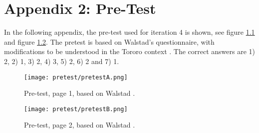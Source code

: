 \chapter{Appendix 2: Pre-Test}\label{cha:pre-test}

In the following appendix, the pre-test used for iteration 4 is shown, see figure \ref{fig:pretest1} and figure \ref{fig:pretest2}. The pretest is based on Walstad's questionnaire, with modifications to be understood in the Tororo context \cite{general-entrepreneurship-quiz}. The correct answers are 1) 2, 2) 1, 3) 2, 4) 3, 5) 2, 6) 2 and 7) 1.

\begin{figure}[h]
    \centering
    \texttt{[image: pretest/pretestA.png]}
    \caption{Pre-test, page 1, based on Walstad \cite{general-entrepreneurship-quiz}.}
    \label{fig:pretest1}
\end{figure}

\begin{figure}[h]
    \centering
    \texttt{[image: pretest/pretestB.png]}
    \caption{Pre-test, page 2, based on Walstad \cite{general-entrepreneurship-quiz}.}
    \label{fig:pretest2}
\end{figure}
